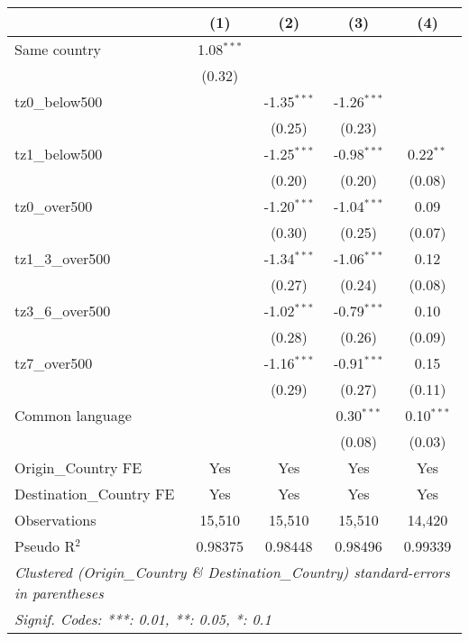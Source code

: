 
\begingroup
\centering
\small
\begin{tabular}{lcccc}
   \toprule
                            & (1)          & (2)           & (3)           & (4)\\  
   \midrule 
   Same country             & 1.08$^{***}$ &               &               &   \\   
                            & (0.32)       &               &               &   \\   
   tz0\_below500            &              & -1.35$^{***}$ & -1.26$^{***}$ &   \\   
                            &              & (0.25)        & (0.23)        &   \\   
   tz1\_below500            &              & -1.25$^{***}$ & -0.98$^{***}$ & 0.22$^{**}$\\   
                            &              & (0.20)        & (0.20)        & (0.08)\\   
   tz0\_over500             &              & -1.20$^{***}$ & -1.04$^{***}$ & 0.09\\   
                            &              & (0.30)        & (0.25)        & (0.07)\\   
   tz1\_3\_over500          &              & -1.34$^{***}$ & -1.06$^{***}$ & 0.12\\   
                            &              & (0.27)        & (0.24)        & (0.08)\\   
   tz3\_6\_over500          &              & -1.02$^{***}$ & -0.79$^{***}$ & 0.10\\   
                            &              & (0.28)        & (0.26)        & (0.09)\\   
   tz7\_over500             &              & -1.16$^{***}$ & -0.91$^{***}$ & 0.15\\   
                            &              & (0.29)        & (0.27)        & (0.11)\\   
   Common language          &              &               & 0.30$^{***}$  & 0.10$^{***}$\\   
                            &              &               & (0.08)        & (0.03)\\   
   \midrule 
   Origin\_Country FE       & Yes          & Yes           & Yes           & Yes\\  
   Destination\_Country FE  & Yes          & Yes           & Yes           & Yes\\  
   \midrule 
   Observations             & 15,510       & 15,510        & 15,510        & 14,420\\  
   Pseudo R$^2$             & 0.98375      & 0.98448       & 0.98496       & 0.99339\\  
   \bottomrule
   \multicolumn{5}{l}{\emph{Clustered (Origin\_Country \& Destination\_Country) standard-errors in parentheses}}\\
   \multicolumn{5}{l}{\emph{Signif. Codes: ***: 0.01, **: 0.05, *: 0.1}}\\
\end{tabular}
\par\endgroup


